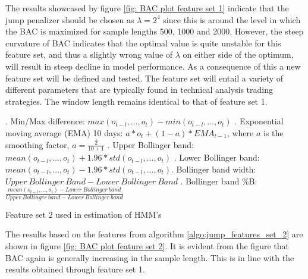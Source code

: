 The results showcased by figure \ref{fig: BAC plot feature set 1} indicate that the jump penalizer should be chosen as $\lambda = 2^4$ since this is around the level in which the BAC is maximized for sample lengths 500, 1000 and 2000. However, the steep curvature of BAC indicates that the optimal value is quite unstable for this feature set, and thus a slightly wrong value of $\lambda$ on either side of the optimum, will result in steep decline in model performance. As a consequence of this a new feature set will be defined and tested. The feature set will entail a variety of different parameters that are typically found in technical analysis trading strategies. The window length remains identical to that of feature set 1.

\begin{algorithm}[H]
. Min/Max difference: $max(o_{t-l},\ldots,o_{t}) - min(o_{t-l},\ldots,o_{t})$ . Exponential moving average (EMA) 10 days: $a * o_t + (1-a) * EMA_{t-1}$, \quad where $a$ is the smoothing factor, $a = \frac{2}{10+1}$ . Upper Bollinger band: $mean(o_{t-l},\ldots,o_t) + 1.96 * std(o_{t-l},\ldots,o_t)$ . Lower Bollinger band: $mean(o_{t-l},\ldots,o_t) - 1.96 * std(o_{t-l},\ldots,o_t)$. Bollinger band width: $Upper\ Bollinger\ Band - Lower\  Bollinger\ Band$ . Bollinger band \%B: $\frac{mean(o_{t-l},\ldots,o_{t}) - Lower\ Bollinger\ band} {Upper\ Bollinger\ band - Lower\ Bollinger\ band}$  \;
\BlankLine
{}
\caption{Feature set 2 used in \jump estimation of HMM's}
\label{algo:jump_features_set_2}
\end{algorithm}

The results based on the features from algorithm \ref{algo:jump_features_set_2} are shown in figure \ref{fig: BAC plot feature set 2}. It is evident from the figure that BAC again is generally increasing in the sample length. This is in line with the results obtained through feature set 1.

